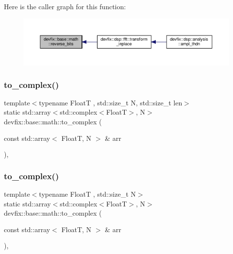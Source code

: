 Here is the caller graph for this function\+:\nopagebreak
\begin{figure}[H]
\begin{center}
\leavevmode
\includegraphics[width=350pt]{structdevfix_1_1base_1_1math_af3260ac1a62b3e9f6feb0f212aa8f796_icgraph}
\end{center}
\end{figure}
\mbox{\label{structdevfix_1_1base_1_1math_aa125625a1d4063dc4bd4de82f7367f14}} 
\subsubsection{\texorpdfstring{to\+\_\+complex()}{to\_complex()}\hspace{0.1cm}{\footnotesize\ttfamily [1/4]}}
{\footnotesize\ttfamily template$<$typename FloatT , std\+::size\+\_\+t N, std\+::size\+\_\+t len$>$ \\
static std\+::array$<$std\+::complex$<$FloatT$>$, N$>$ devfix\+::base\+::math\+::to\+\_\+complex (\begin{DoxyParamCaption}\item[{const std\+::array$<$ FloatT, N $>$ \&}]{arr }\end{DoxyParamCaption})\hspace{0.3cm}{\ttfamily [inline]}, {\ttfamily [static]}}

\mbox{\label{structdevfix_1_1base_1_1math_ad142f8342011042e1420eed41c833db0}} 
\subsubsection{\texorpdfstring{to\+\_\+complex()}{to\_complex()}\hspace{0.1cm}{\footnotesize\ttfamily [2/4]}}
{\footnotesize\ttfamily template$<$typename FloatT , std\+::size\+\_\+t N$>$ \\
static std\+::array$<$std\+::complex$<$FloatT$>$, N$>$ devfix\+::base\+::math\+::to\+\_\+complex (\begin{DoxyParamCaption}\item[{const std\+::array$<$ FloatT, N $>$ \&}]{arr }\end{DoxyParamCaption})\hspace{0.3cm}{\ttfamily [inline]}, {\ttfamily [static]}}

